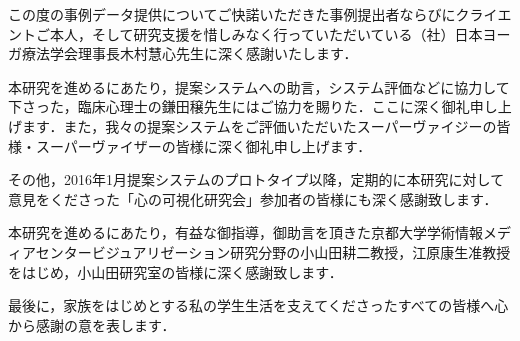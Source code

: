 \documentclass[shuuron]{kuee}
\begin{document}
\begin{acknowledgements}
  この度の事例データ提供についてご快諾いただきた事例提出者ならびにクライエントご本人，そして研究支援を惜しみなく行っていただいている（社）日本ヨーガ療法学会理事長木村慧心先生に深く感謝いたします．

  本研究を進めるにあたり，提案システムへの助言，システム評価などに協力して下さった，臨床心理士の鎌田穣先生にはご協力を賜りた．ここに深く御礼申し上げます．また，我々の提案システムをご評価いただいたスーパーヴァイジーの皆様・スーパーヴァイザーの皆様に深く御礼申し上げます．

  その他，2016年1月提案システムのプロトタイプ以降，定期的に本研究に対して意見をくださった「心の可視化研究会」参加者の皆様にも深く感謝致します．

  本研究を進めるにあたり，有益な御指導，御助言を頂きた京都大学学術情報メディアセンタービジュアリゼーション研究分野の小山田耕二教授，江原康生准教授をはじめ，小山田研究室の皆様に深く感謝致します．




  最後に，家族をはじめとする私の学生生活を支えてくださったすべての皆様へ心から感謝の意を表します．
\end{acknowledgements}





\end{document}
